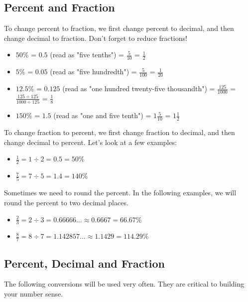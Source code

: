 \subsection{Percent and Fraction}
To change percent to fraction, we first change percent to decimal, and then change decimal to fraction. Don't forget to reduce fractions!
\begin{itemize}
\item $50\%$ = $0.5$ (read as "five tenths") = $\frac{5}{10}$ = $\frac{1}{2}$
\item $5\%$ = $0.05$ (read as "five hundredth") = $\frac{5}{100}$ = $\frac{1}{20}$
\item $12.5\%$ = $0.125$ (read as "one hundred twenty-five thousandth") = $\frac{125}{1000}$ = $\frac{125\div125}{1000\div125}$ = $\frac{1}{8}$
\item $150\%$ = $1.5$ (read as "one and five tenth") = $1\frac{5}{10}$ = $1\frac{1}{2}$
\end{itemize}

To change fraction to percent, we first change fraction to decimal, and then change decimal to percent. Let's look at a few examples:
\begin{itemize}
\item $\frac{1}{2} = 1\div2 = 0.5 = 50\%$
\item $\frac{7}{5} = 7\div5 = 1.4 = 140\%$
\end{itemize}

Sometimes we need to round the percent. In the following examples, we will round the percent to two decimal places.
\begin{itemize}
\item $\frac{2}{3} = 2\div3 = 0.66666... \approx 0.6667 = 66.67\%$
\item $\frac{8}{7} = 8\div7 = 1.142857...\approx 1.1429 = 114.29\%$
\end{itemize}

\subsection{Percent, Decimal and Fraction}
The following conversions will be used very often. They are critical to building your number sense.


